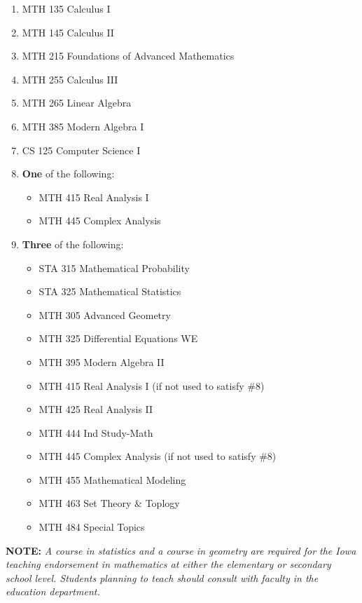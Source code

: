 \documentclass[
  letterpaper,
]{scrbook}
\providecommand{\tightlist}{%
  \setlength{\itemsep}{0pt}\setlength{\parskip}{0pt}}
\begin{document}
\begin{enumerate}
\def\labelenumi{\arabic{enumi}.}
\tightlist
\item
  MTH 135 Calculus I
\item
  MTH 145 Calculus II
\item
  MTH 215 Foundations of Advanced Mathematics
\item
  MTH 255 Calculus III
\item
  MTH 265 Linear Algebra
\item
  MTH 385 Modern Algebra I
\item
  CS 125 Computer Science I
\item
  \textbf{One} of the following:

  \begin{itemize}
  \tightlist
  \item
    MTH 415 Real Analysis I
  \item
    MTH 445 Complex Analysis
  \end{itemize}
\item
  \textbf{Three} of the following:

  \begin{itemize}
  \tightlist
  \item
    STA 315 Mathematical Probability
  \item
    STA 325 Mathematical Statistics
  \item
    MTH 305 Advanced Geometry
  \item
    MTH 325 Differential Equations WE
  \item
    MTH 395 Modern Algebra II
  \item
    MTH 415 Real Analysis I (if not used to satisfy \#8)
  \item
    MTH 425 Real Analysis II
  \item
    MTH 444 Ind Study-Math
  \item
    MTH 445 Complex Analysis (if not used to satisfy \#8)
  \item
    MTH 455 Mathematical Modeling
  \item
    MTH 463 Set Theory \& Toplogy
  \item
    MTH 484 Special Topics
  \end{itemize}
\end{enumerate}

\textbf{NOTE:} \emph{A course in statistics and a course in geometry are
required for the Iowa teaching endorsement in mathematics at either the
elementary or secondary school level. Students planning to teach should
consult with faculty in the education department. }
\end{document}
